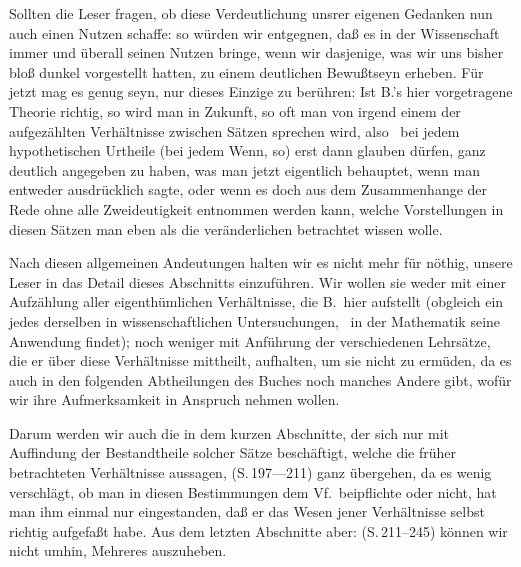 Sollten die Leser fragen, ob diese Verdeutlichung unsrer eigenen Gedanken nun auch einen Nutzen schaffe: so würden wir entgegnen, daß es in der Wissenschaft immer und überall seinen Nutzen bringe, wenn wir dasjenige, was wir uns bisher bloß dunkel vorgestellt hatten, zu einem deutlichen Bewußtseyn erheben. Für jetzt mag es genug seyn, nur dieses Einzige zu berühren: Ist B.'s hier vorgetragene Theorie richtig, so wird man in Zukunft, so oft man von irgend einem der aufgezählten Verhältnisse zwischen Sätzen sprechen wird, also \zB\ bei jedem hypothetischen Urtheile (bei jedem Wenn, so) erst dann glauben dürfen, ganz deutlich angegeben zu haben, was man jetzt eigentlich behauptet, wenn man entweder ausdrücklich sagte, oder wenn es doch aus dem Zusammenhange der Rede ohne alle Zweideutigkeit entnommen werden kann, welche Vorstellungen in diesen Sätzen man eben als die veränderlichen betrachtet wissen wolle. \par
Nach diesen allgemeinen Andeutungen halten wir es nicht mehr für nöthig, unsere Leser in das Detail dieses Abschnitts einzuführen. Wir wollen sie weder mit einer Aufzählung aller eigenthümlichen Verhältnisse, die B.\ hier aufstellt (obgleich ein jedes derselben in wissenschaftlichen Untersuchungen, \zB\ in der Mathematik seine  Anwendung findet); noch weniger mit Anführung der verschiedenen Lehrsätze, die er über diese Verhältnisse mittheilt, aufhalten, um sie nicht zu ermüden, da es auch in den folgenden Abtheilungen des Buches noch manches Andere gibt, wofür wir ihre Aufmerksamkeit in Anspruch nehmen wollen. \par
\gliederungslinie\par
Darum werden wir auch die in dem kurzen Abschnitte, der sich nur mit Auffindung der Bestandtheile solcher Sätze beschäftigt, welche die früher betrachteten Verhältnisse aussagen, (S.\,197---211) ganz übergehen, da es wenig verschlägt,  ob man in diesen Bestimmungen dem Vf.\ beipflichte oder nicht, hat man ihm einmal nur eingestanden, daß er das Wesen jener Verhältnisse selbst richtig aufgefaßt habe. Aus dem letzten Abschnitte aber:  (S.\,211--245) können wir nicht umhin, Mehreres auszuheben. \par
